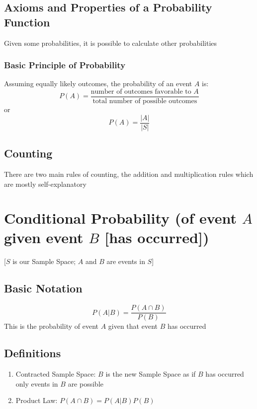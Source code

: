 \documentclass[12pt]{article}
\begin{document}
        \subsection{Axioms and Properties of a Probability Function}
            Given some probabilities, it is possible to calculate other probabilities
            \subsubsection{Basic Principle of Probability}
                Assuming equally likely outcomes, the probability of an event $A$ is:
                \begin{equation}
                    P(A) = \frac{\text{number of outcomes favorable to } A}{\text{total number of possible outcomes}}
                \end{equation}
                or
                \begin{equation}
                    P(A) = \frac{|A|}{|S|}
                \end{equation}
        \subsection{Counting}
            There are two main rules of counting, the addition and multiplication rules which are mostly self-explanatory
    \section{Conditional Probability (of event $A$ given event $B$ [has occurred])}
        [$S$ is our Sample Space; $A$ and $B$ are events in $S$]
        \subsection{Basic Notation}
            \begin{equation}
                P(A|B) = \frac{P(A \cap B)}{P(B)}
            \end{equation}
            This is the probability of event $A$ given that event $B$ has occurred
        \subsection{Definitions}
            \begin{enumerate}
                \item Contracted Sample Space: $B$ is the new Sample Space as if $B$ has occurred only events in $B$ are possible
                \item Product Law: $P(A \cap B) = P(A|B)P(B)$
            \end{enumerate}
\end{document}

